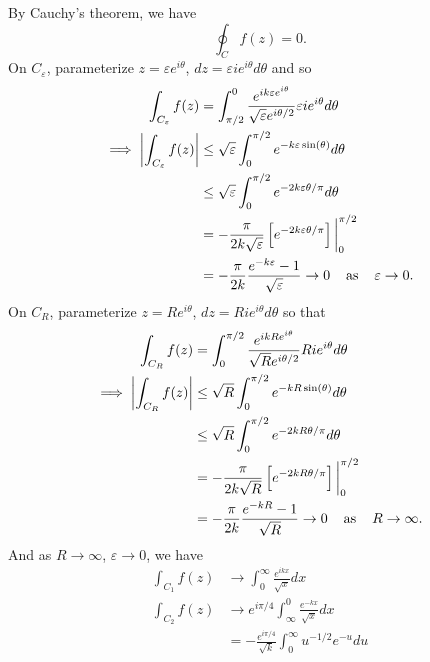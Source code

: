 \documentclass{article}
\begin{document}
\begin{itemize}
\begin{itemize}
        By Cauchy's theorem, we have
        \[\oint_C f(z) = 0.\]
        On $C_{\varepsilon}$, parameterize $z = \varepsilon e^{i\theta}$, $dz = \varepsilon i e^{i\theta}d\theta$ and so
        \begin{align*}
            \int_{C_{\varepsilon}} f(z) &= \int_{\pi/2}^0\frac{e^{ik\varepsilon e^{i\theta}}}{\sqrt{\varepsilon}e^{i\theta/2}}\varepsilon i e^{i\theta}d\theta\\
            \implies \left|\int_{C_{\varepsilon}} f(z)\right| &\leq \sqrt{\varepsilon}\int_0^{\pi/2}e^{-k\varepsilon \sin(\theta)}d\theta\\
            &\leq \sqrt{\varepsilon}\int_0^{\pi/2}e^{-2k\varepsilon\theta/\pi}d\theta\\
            &= -\frac{\pi}{2k\sqrt{\varepsilon}}\left[e^{- 2k\varepsilon\theta/\pi}\right]\bigg|_0^{\pi/2}\\
            &= -\frac{\pi}{2k}\frac{e^{-k\varepsilon} - 1}{\sqrt{\varepsilon}} \to 0 \hspace{0.4cm} \text{as} \hspace{0.4cm} \varepsilon \to 0.
        \end{align*}
        On $C_R$, parameterize $z = Re^{i\theta}$, $dz = Rie^{i\theta}d\theta$ so that
        \begin{align*}
            \int_{C_R}f(z) &= \int_0^{\pi/2}\frac{e^{ikR e^{i\theta}}}{\sqrt{R}e^{i\theta/2}}Rie^{i\theta}d\theta\\
            \implies \left|\int_{C_R}f(z)\right| &\leq \sqrt{R}\int_0^{\pi/2}e^{-kR\sin(\theta)}d\theta\\
            &\leq \sqrt{R}\int_0^{\pi/2} e^{-2kR\theta/\pi}d\theta\\
            &= -\frac{\pi}{2k\sqrt{R}}\left[e^{-2kR\theta/\pi}\right]\bigg|_0^{\pi/2}\\
            &= -\frac{\pi}{2k}\frac{e^{-kR} - 1}{\sqrt{R}} \to 0 \hspace{0.4cm} \text{as} \hspace{0.4cm} R \to \infty.
        \end{align*}
        And as $R \to \infty$, $\varepsilon \to 0$, we have
        \begin{align*}
            \int_{C_1}f(z) &\to \int_0^{\infty} \frac{e^{ikx}}{\sqrt{x}}dx\\
            \int_{C_2}f(z) &\to e^{i\pi/4}\int_{\infty}^0 \frac{e^{-kx}}{\sqrt{x}}dx\\
            &= -\frac{e^{i\pi/4}}{\sqrt{k}}\int_0^{\infty}u^{-1/2}e^{-u}du\\

\end{align*}
\end{itemize}
\end{itemize}
\end{document}
